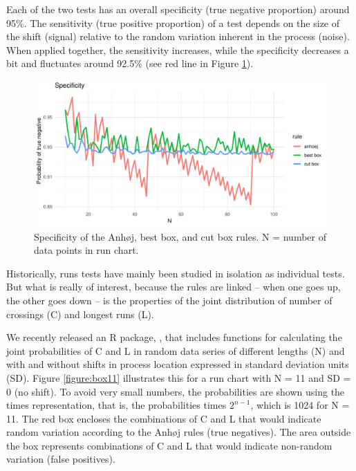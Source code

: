 Each of the two tests has an overall specificity (true negative
proportion) around 95\%. The sensitivity (true positive proportion) of a
test depends on the size of the shift (signal) relative to the random
variation inherent in the process (noise). When applied together, the
sensitivity increases, while the specificity decreases a bit and
fluctuates around 92.5\% (see red line in Figure \ref{figure:spec}).

\begin{figure}[htbp]
  \centering
  \includegraphics[width=\textwidth]{fig_spec.pdf}
  \caption{Specificity of the Anhøj, best box, and cut box rules. N = number of data points in run chart. }
  \label{figure:spec}
\end{figure}

Historically, runs tests have mainly been studied in isolation as
individual tests. But what is really of interest, because the rules are
linked -- when one goes up, the other goes down -- is the properties of
the joint distribution of number of crossings (C) and longest runs (L).

We recently released an R package,  \citep{twl2018},
that includes functions for calculating the joint probabilities of C and
L in random data series of different lengths (N) and with and without
shifts in process location expressed in standard deviation units (SD).
Figure \ref{figure:box11} illustrates this for a run chart with N = 11
and SD = 0 (no shift). To avoid very small numbers, the probabilities
are shown using the times representation, that is, the probabilities
times \(2^{n-1}\), which is 1024 for N = 11. The red box encloses the
combinations of C and L that would indicate random variation according
to the Anhøj rules (true negatives). The area outside the box represents
combinations of C and L that would indicate non-random variation (false
positives).

